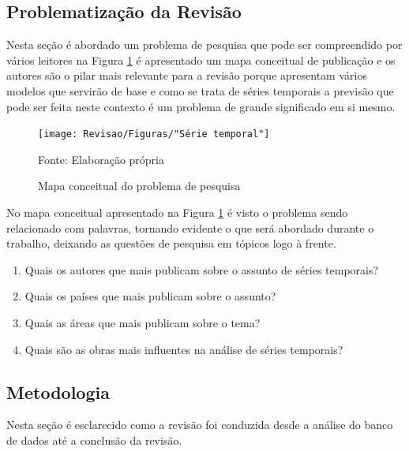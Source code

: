 \subsection{Problematiza\c c\~ao da Revis\~ao} \label{subsec: problematização da revisão}

Nesta seção é abordado um problema de pesquisa que pode ser compreendido por vários leitores na Figura \ref{fig:serie-temporal} é apresentado um mapa conceitual de publicação e os autores são o pilar mais relevante para a revisão porque apresentam vários modelos que servirão de base e como se trata de séries temporais a previsão que pode ser feita neste contexto é um problema de grande significado em si mesmo.

\begin{figure}[H]
	\centering
	\caption{Mapa conceitual do problema de pesquisa}
	\label{fig:serie-temporal}
	\texttt{[image: Revisao/Figuras/"Série temporal"]}
	
	Fonte: Elaboração própria 
\end{figure}

No mapa conceitual apresentado na Figura \ref{fig:serie-temporal} é visto o problema sendo relacionado com palavras, tornando evidente o que será abordado durante o trabalho, deixando as questões de pesquisa em tópicos logo à frente.

\begin{enumerate}[start=1, label = {\textbf{Q} \arabic* } ]
	\item \label{questão:rev1}Quais os autores que mais publicam sobre o assunto de séries temporais?
	\item \label{questão:rev2}Quais os países que mais publicam sobre o assunto? 
	\item \label{questão:rev3}Quais as áreas que mais publicam sobre o tema?
	\item \label{questão:rev4}Quais são as obras mais influentes na análise de séries temporais?
\end{enumerate}

\subsection{Metodologia}\label{subsec:met da revisão}

Nesta seção é esclarecido como a revisão foi conduzida desde a análise do banco de dados até a conclusão da revisão.

